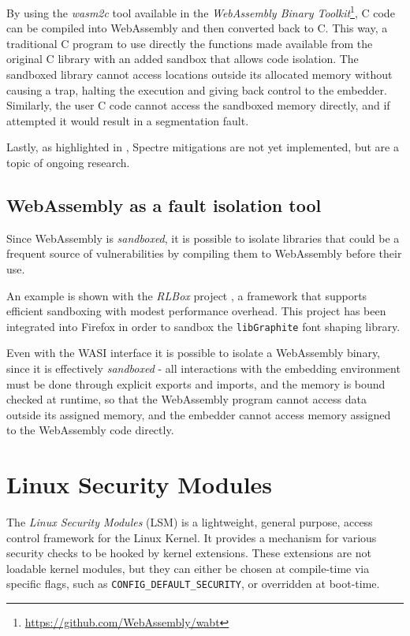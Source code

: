 By using the \textit{wasm2c} tool available in the \textit{WebAssembly Binary Toolkit}\footnote{\url{https://github.com/WebAssembly/wabt}},
C code can be compiled into WebAssembly and then converted back to C.
This way, a traditional C program to use directly the functions made available from the original C library with an added sandbox
that allows code isolation. The sandboxed library cannot access locations outside its allocated memory without causing a trap,
halting the execution and giving back control to the embedder.
Similarly, the user C code cannot access the sandboxed memory directly, and if attempted it would result in a segmentation fault.

Lastly, as highlighted in \cite{wasmtime-security-sandboxing}, Spectre mitigations are not yet implemented, but are a topic of
ongoing research.

\subsection{WebAssembly as a fault isolation tool}

Since WebAssembly is \textit{sandboxed}, it is possible to isolate libraries that could be a frequent source of
vulnerabilities by compiling them to WebAssembly before their use.

An example is shown with the \textit{RLBox} project \cite{wasm-firefox-isolation-2020},
a framework that supports efficient sandboxing with modest performance overhead.
This project has been integrated into Firefox in order to sandbox the \texttt{libGraphite} font shaping library.

Even with the WASI interface it is possible to isolate a WebAssembly binary, since it is effectively \textit{sandboxed}
- all interactions with the embedding environment must be done through explicit exports and imports, and the memory is
bound checked at runtime, so that the WebAssembly program cannot access data outside its assigned memory, and the
embedder cannot access memory assigned to the WebAssembly code directly.

\section{Linux Security Modules}

The \textit{Linux Security Modules} (LSM) \cite{lsm-2002, kernel-lsm}
is a lightweight, general purpose, access control framework for the Linux Kernel.
It provides a mechanism for various security checks to be hooked by kernel extensions.
These extensions are not loadable kernel modules, but they can either be chosen at
compile-time via specific flags, such as \texttt{CONFIG\_DEFAULT\_SECURITY}, or overridden at boot-time.


